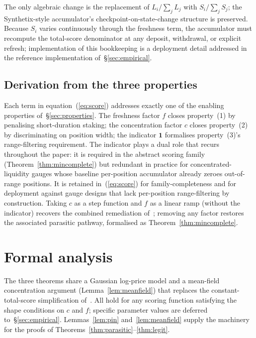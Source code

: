 \documentclass[11pt,a4paper]{article}
\theoremstyle{cgdefinition}
\theoremstyle{cgplain}
\theoremstyle{cgremark}
\begin{document}
The only algebraic change is the replacement of $L_i / \sum_j L_j$ with $S_i / \sum_j S_j$; the Synthetix-style accumulator's checkpoint-on-state-change structure is preserved. Because $S_i$ varies continuously through the freshness term, the accumulator must recompute the total-score denominator at any deposit, withdrawal, or explicit refresh; implementation of this bookkeeping is a deployment detail addressed in the reference implementation of~\S\ref{sec:empirical}.

\subsection{Derivation from the three properties}\label{sec:mapping}

Each term in equation~(\ref{eq:score}) addresses exactly one of the enabling properties of~\S\ref{sec:properties}. The freshness factor $f$ closes property~(1) by penalising short-duration staking; the concentration factor $c$ closes property~(2) by discriminating on position width; the indicator $\mathbf{1}$ formalises property~(3)'s range-filtering requirement. The indicator plays a dual role that recurs throughout the paper: it is required in the abstract scoring family (Theorem~\ref{thm:mincomplete}) but redundant in practice for concentrated-liquidity gauges whose baseline per-position accumulator already zeroes out-of-range positions. It is retained in~(\ref{eq:score}) for family-completeness and for deployment against gauge designs that lack per-position range-filtering by construction. Taking $c$ as a step function and $f$ as a linear ramp (without the indicator) recovers the combined remediation of~\cite[\S5.3]{ryan2026c}; removing any factor restores the associated parasitic pathway, formalised as Theorem~\ref{thm:mincomplete}.

\section{Formal analysis}\label{sec:analysis}

The three theorems share a Gaussian log-price model and a mean-field concentration argument (Lemma~\ref{lem:meanfield}) that replaces the constant-total-score simplification of~\cite[\S5]{ryan2026c}. All hold for any scoring function satisfying the shape conditions on $c$ and $f$; specific parameter values are deferred to~\S\ref{sec:empirical}. Lemmas~\ref{lem:pin} and~\ref{lem:meanfield} supply the machinery for the proofs of Theorems~\ref{thm:parasitic}--\ref{thm:legit}.
\end{document}

